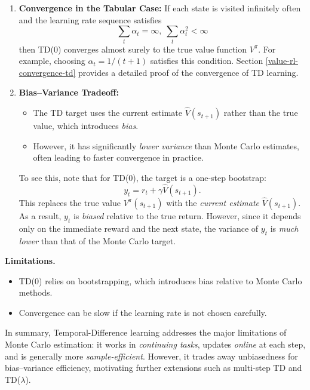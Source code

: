 \documentclass[
]{book}
\theoremstyle{definition}
\theoremstyle{definition}
\theoremstyle{definition}
\theoremstyle{definition}
\theoremstyle{remark}
\begin{document}
\begin{enumerate}
\def\labelenumi{\arabic{enumi}.}
\item
  \textbf{Convergence in the Tabular Case:} If each state is visited infinitely often and the learning rate sequence satisfies
  \[
  \sum_t \alpha_t = \infty, \; \sum_t \alpha_t^2 < \infty
  \]
  then TD(0) converges almost surely to the true value function \(V^\pi\). For example, choosing \(\alpha_t = 1/(t+1)\) satisfies this condition. Section \ref{value-rl-convergence-td} provides a detailed proof of the convergence of TD learning.
\item
  \textbf{Bias--Variance Tradeoff:}

  \begin{itemize}
  \item
    The TD target uses the current estimate \(\hat{V}(s_{t+1})\) rather than the true value, which introduces \emph{bias}.
  \item
    However, it has significantly \emph{lower variance} than Monte Carlo estimates, often leading to faster convergence in practice.
  \end{itemize}

  To see this, note that for TD(0), the target is a one-step bootstrap:
  \[
  y_t = r_t + \gamma \hat{V}(s_{t+1}).
  \]
  This replaces the true value \(V^\pi(s_{t+1})\) with the \emph{current estimate} \(\hat{V}(s_{t+1})\). As a result, \(y_t\) is \emph{biased} relative to the true return. However, since it depends only on the immediate reward and the next state, the variance of \(y_t\) is \emph{much lower} than that of the Monte Carlo target.
\end{enumerate}

\textbf{Limitations.}

\begin{itemize}
\item
  TD(0) relies on bootstrapping, which introduces bias relative to Monte Carlo methods.
\item
  Convergence can be slow if the learning rate is not chosen carefully.
\end{itemize}

In summary, Temporal-Difference learning addresses the major limitations of Monte Carlo estimation: it works in \emph{continuing tasks}, updates \emph{online} at each step, and is generally more \emph{sample-efficient}. However, it trades away unbiasedness for bias--variance efficiency, motivating further extensions such as multi-step TD and TD(\(\lambda\)).
\end{document}
